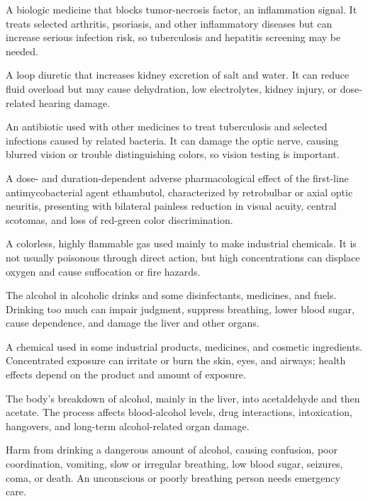  A biologic medicine that blocks tumor-necrosis factor, an inflammation signal. It treats selected arthritis, psoriasis, and other inflammatory diseases but can increase serious infection risk, so tuberculosis and hepatitis screening may be needed.

 A loop diuretic that increases kidney excretion of salt and water. It can reduce fluid overload but may cause dehydration, low electrolytes, kidney injury, or dose-related hearing damage.

 An antibiotic used with other medicines to treat tuberculosis and selected infections caused by related bacteria. It can damage the optic nerve, causing blurred vision or trouble distinguishing colors, so vision testing is important.

 A dose- and duration-dependent adverse pharmacological effect of the first-line antimycobacterial agent ethambutol, characterized by retrobulbar or axial optic neuritis, presenting with bilateral painless reduction in visual acuity, central scotomas, and loss of red-green color discrimination.

 A colorless, highly flammable gas used mainly to make industrial chemicals. It is not usually poisonous through direct action, but high concentrations can displace oxygen and cause suffocation or fire hazards.

 The alcohol in alcoholic drinks and some disinfectants, medicines, and fuels. Drinking too much can impair judgment, suppress breathing, lower blood sugar, cause dependence, and damage the liver and other organs.

 A chemical used in some industrial products, medicines, and cosmetic ingredients. Concentrated exposure can irritate or burn the skin, eyes, and airways; health effects depend on the product and amount of exposure.

 The body’s breakdown of alcohol, mainly in the liver, into acetaldehyde and then acetate. The process affects blood-alcohol levels, drug interactions, intoxication, hangovers, and long-term alcohol-related organ damage.

 Harm from drinking a dangerous amount of alcohol, causing confusion, poor coordination, vomiting, slow or irregular breathing, low blood sugar, seizures, coma, or death. An unconscious or poorly breathing person needs emergency care.

